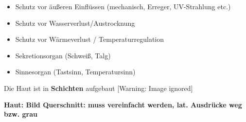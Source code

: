 \documentclass{article}
\newcommand\gEs[1]{\textbf{\textcolor[rgb]{0.0,0.0,0.5019608}{#1}}}
\newcommand\gEs[1]{\textbf{\textcolor[rgb]{0.0,0.0,0.5019608}{#1}}}
\begin{document}
\begin{itemize}
\item {\mdseries
Schutz vor \"au{\ss}eren Einfl\"ussen (mechanisch, Erreger, UV-Strahlung
etc.)}

\item {\mdseries
Schutz vor Wasserverlust/Austrocknung}

\item {\mdseries
Schutz vor W\"armeverlust /  Temperaturregulation}

\item {\mdseries
Sekretionsorgan (Schwei{\ss}, Talg)}

\item {\mdseries
Sinnesorgan (Tastsinn, Temperatursinn)}

\end{itemize}
{\mdseries\color{black}
Die Haut ist in \gEs{Schichten} aufgebaut%
%
  [Warning: Image ignored] %
 }

{\bfseries\color[rgb]{0.5019608,0.0,0.0}
Haut: Bild Querschnitt: muss vereinfacht werden, lat. Ausdr\"ucke weg
bzw. grau}
\end{document}
